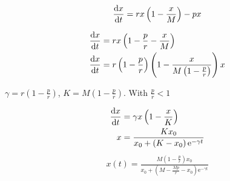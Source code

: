 \begin{equation}
	\frac{\mathrm{d} x}{{\mathrm{d} t}}=rx\left(1-\frac{x}{M}\right)-px
\end{equation}

\begin{align}
\frac{\mathrm{d} x}{{\mathrm{d} t}}&=rx\left(1-\frac{p}{r}-\frac{x}{M}\right) \\
\frac{\mathrm{d} x}{{\mathrm{d} t}}&=r\left(1-\frac{p}{r}\right)\left(1-\frac{x}{M\left(1-\frac{p}{r}\right)}\right)x
\end{align}

$\gamma=r\left(1-\frac{p}{r}\right)$, $K=M\left(1-\frac{p}{r}\right)$. With $\frac{p}{r}<1$

\begin{align}
	\frac{\mathrm{d} x}{{\mathrm{d} t}}&=\gamma x\left(1-\frac{x}{K}\right)\\
	x&=\frac{Kx_0}{x_0+\left(K-x_0\right)\mathrm{e}^{-\gamma t}}
\end{align}
\begin{align}
	x(t)=\frac{M\left(1-\frac{p}{r}\right)x_0}{x_0+\left(M-\frac{Mp}{r}-x_0\right)\mathrm{e}^{-\gamma t}}
\end{align}